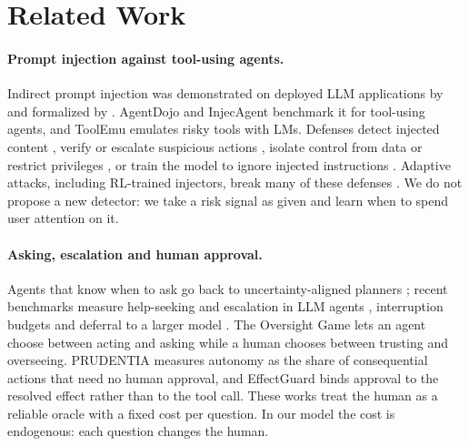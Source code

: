 \documentclass[10pt]{article}
\theoremstyle{plain}
\theoremstyle{definition}
\begin{document}
\section{Related Work}\label{sec:related}

\paragraph{Prompt injection against tool-using agents.} Indirect prompt injection was demonstrated on deployed LLM applications by \citet{greshake2023not} and formalized by \citet{liu2024formalizing}. AgentDojo \citep{debenedetti2024agentdojo} and InjecAgent \citep{zhan2024injecagent} benchmark it for tool-using agents, and ToolEmu \citep{ruan2024toolemu} emulates risky tools with LMs. Defenses detect injected content \citep{meta2025promptguard2,zhu2025melon}, verify or escalate suspicious actions \citep{liang2025sieve}, isolate control from data or restrict privileges \citep{debenedetti2025camel,shi2025progent,kolluri2026prudentia}, or train the model to ignore injected instructions \citep{chen2025struq,chen2025secalign,sha2025agent,wang2025arlas,weng2026agentantibody}. Adaptive attacks, including RL-trained injectors, break many of these defenses \citep{nasr2025attacker,chen2026learning,autodojo2026}. We do not propose a new detector: we take a risk signal as given and learn when to spend user attention on it.

\paragraph{Asking, escalation and human approval.} Agents that know when to ask go back to uncertainty-aligned planners \citep{ren2023knowno}; recent benchmarks measure help-seeking and escalation in LLM agents \citep{trinh2026hilbench,dossantos2026act}, interruption budgets \citep{zhang2026askless} and deferral to a larger model \citep{piatrashyn2026redact}. The Oversight Game \citep{overman2026oversight} lets an agent choose between acting and asking while a human chooses between trusting and overseeing. PRUDENTIA \citep{kolluri2026prudentia} measures autonomy as the share of consequential actions that need no human approval, and EffectGuard \citep{effectguard2026} binds approval to the resolved effect rather than to the tool call. These works treat the human as a reliable oracle with a fixed cost per question. In our model the cost is endogenous: each question changes the human.
\end{document}
